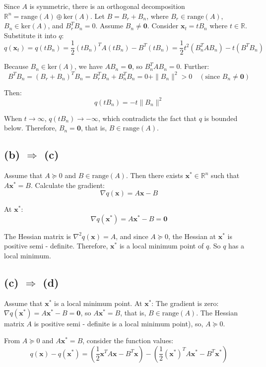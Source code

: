 \documentclass{article}
\begin{document}
Since $ A $ is symmetric, there is an orthogonal decomposition $ \mathbb{R}^n=\text{range}(A)\oplus \text{ker}(A) $. Let $ B=B_r+B_n $, where $ B_r \in \text{range}(A) $, $ B_n \in \text{ker}(A) $, and $ B_r^TB_n = 0 $. Assume $ B_n\neq \mathbf{0} $. Consider $ \mathbf{x}_t = tB_n $ where $ t \in \mathbb{R} $. Substitute it into $q $:
$$
q(\mathbf{x}_t)=q(tB_n)=\frac{1}{2}(tB_n)^TA(tB_n)-B^T(tB_n)=\frac{1}{2}t^2(B_n^TAB_n)-t(B^TB_n)
$$

Because $ B_n \in \text{ker}(A) $, we have $ AB_n=\mathbf{0} $, so $ B_n^TAB_n = 0 $. Further:
$$
B^TB_n=(B_r + B_n)^TB_n=B_r^TB_n+B_n^TB_n = 0+\|B_n\|^2>0\quad (\text{since } B_n\neq \mathbf{0})
$$

Then:
$$
q(tB_n)=-t\|B_n\|^2
$$

When $ t \to \infty $, $ q(tB_n)\to -\infty $, which contradicts the fact that $ q $ is bounded below. Therefore, $ B_n=\mathbf{0} $, that is, $ B \in \text{range}(A)$.

\subsection*{(b) $\Rightarrow$ (c)}

Assume that $ A \succeq 0 $ and $ B \in \text{range}(A) $. Then there exists $ \mathbf{x}^* \in \mathbb{R}^n $ such that $ A\mathbf{x}^* = B $. Calculate the gradient:
$$
\nabla q(\mathbf{x}) = A\mathbf{x} - B
$$

At $ \mathbf{x}^* $:
$$
\nabla q(\mathbf{x}^*) = A\mathbf{x}^* - B = \mathbf{0}
$$

The Hessian matrix is $ \nabla^2 q(\mathbf{x}) = A $, and since $ A \succeq 0 $, the Hessian at $ \mathbf{x}^* $ is positive semi - definite. Therefore, $ \mathbf{x}^* $ is a local minimum point of $ q $. So $ q $ has a local minimum.

\subsection*{(c) $\Rightarrow$ (d)}

Assume that $ \mathbf{x}^* $ is a local minimum point. At $ \mathbf{x}^* $:
The gradient is zero: $ \nabla q(\mathbf{x}^*) = A\mathbf{x}^* - B = \mathbf{0} $, so $ A\mathbf{x}^* = B $, that is, $ B \in \text{range}(A) $.
The Hessian matrix $ A $ is positive semi - definite is a local minimum point), so, $ A \succeq 0 $.

From $ A \succeq 0 $ and $ A\mathbf{x}^* = B $, consider the function values:
$$
q(\mathbf{x}) - q(\mathbf{x}^*) = \left( \frac{1}{2}\mathbf{x}^TA\mathbf{x} - B^T\mathbf{x} \right)-\left
(\frac{1}{2}(\mathbf{x}^*)^TA\mathbf{x}^* - B^T\mathbf{x}^* \right)
$$
\end{document}
